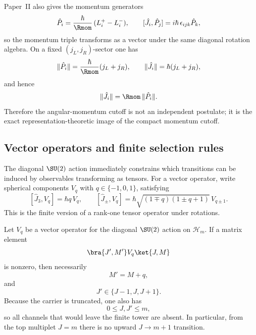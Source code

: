 \documentclass[12pt,a4paper]{article}
\begin{document}
Paper~II also gives the momentum generators
\begin{equation}
\label{p4:eq:Pi-angular}
\hat P_i=\frac{\hbar}{\Rmom}\,(L_i^+-L_i^-),
\qquad
[\hat J_i,\hat P_j]=i\hbar\,\epsilon_{ijk}\hat P_k,
\end{equation}
so the momentum triple transforms as a vector under the same diagonal rotation algebra.
On a fixed \((j_L,j_R)\)-sector one has
\begin{equation}
\label{p4:eq:JP-sector-norm}
\|\hat P_i\|=\frac{\hbar}{\Rmom}(j_L+j_R),
\qquad
\|\hat J_i\|=\hbar(j_L+j_R),
\end{equation}
and hence
\begin{equation}
\label{p4:eq:JP-relation}
\|\hat J_i\|=\Rmom\,\|\hat P_i\|.
\end{equation}
Therefore the angular-momentum cutoff is not an independent postulate; it is the exact representation-theoretic image of the compact momentum cutoff.



\subsection{Vector operators and finite selection rules}
\label{p4:sec:part2-selection}

The diagonal \(\SU(2)\) action immediately constrains which transitions can be induced by observables transforming as tensors.
For a vector operator, write spherical components \(V_q\) with \(q\in\{-1,0,1\}\), satisfying
\begin{equation}
\label{p4:eq:vector-operator}
[\hat J_3,V_q]=\hbar q\,V_q,
\qquad
[\hat J_\pm,V_q]=\hbar\sqrt{(1\mp q)(1\pm q+1)}\,V_{q\pm1}.
\end{equation}
This is the finite version of a rank-one tensor operator under rotations.

\begin{theorem}
\label{p4:thm:vector-selection}
Let \(V_q\) be a vector operator for the diagonal \(\SU(2)\) action on \(\mathcal H_m\).
If a matrix element
\begin{equation}
\label{p4:eq:vector-me}
\bra{J',M'}V_q\ket{J,M}
\end{equation}
is nonzero, then necessarily
\begin{equation}
\label{p4:eq:selection-M}
M'=M+q,
\end{equation}
and
\begin{equation}
\label{p4:eq:selection-J}
J'\in\{J-1,J,J+1\}.
\end{equation}
Because the carrier is truncated, one also has
\begin{equation}
\label{p4:eq:selection-trunc}
0\le J,J'\le m,
\end{equation}
so all channels that would leave the finite tower are absent.
In particular, from the top multiplet \(J=m\) there is no upward \(J\to m+1\) transition.
\end{theorem}
\end{document}
